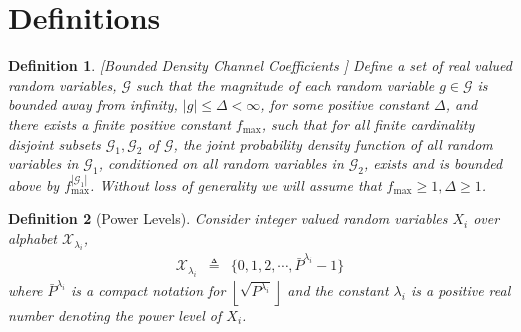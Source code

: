 \documentclass[11pt]{article}
\newtheorem{definition}{Definition}
\begin{document}


\section{Definitions}
\begin{definition}\label{bd}[Bounded Density Channel Coefficients \cite{Arash_Jafar_PN}] Define a set of real valued random variables, $\mathcal{G}$ such that the magnitude of each random variable $g\in\mathcal{G}$ is bounded away from  infinity, $ |g|\leq\Delta<\infty$, for some positive constant $\Delta$, and there exists a finite positive constant $f_{\max}$, such that for all finite cardinality disjoint subsets $\mathcal{G}_1, \mathcal{G}_2$ of $\mathcal{G}$, the joint probability density function of all random variables in $\mathcal{G}_1$, conditioned on all random variables in $\mathcal{G}_2$, exists and is bounded above by $f_{\max}^{|\mathcal{G}_1|}$. Without loss of generality we will assume that $f_{\max}\geq 1, \Delta\geq 1$.
\end{definition}




\begin{definition}[Power Levels] Consider integer valued random variables $X_i$ over alphabet $\mathcal{X}_{\lambda_i}$,
\begin{eqnarray}
\mathcal{X}_{\lambda_i}&\triangleq&\{0,1,2,\cdots,\bar{P}^{\lambda_i}-1\}
\end{eqnarray}
where $\bar{P}^{\lambda_i}$ is a compact notation for $\left\lfloor\sqrt{P^{\lambda_i}}\right\rfloor$ and the constant $\lambda_i$ is a positive real number denoting the \emph{power level} of $X_i$. 
\end{definition}
\end{document}
